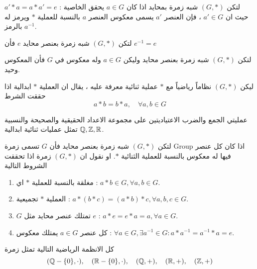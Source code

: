 \begin{definition}[(  المعكوس )]
	لتكن $(G, *)$ شبه زمرة بمحايد اذا كان $a\in G$ يحقق الخاصية : $a'*a=a*a'=e$ حيث ان $a'\in G$ ، فإن العنصر $a'$ يسمى معكوس العنصر $a$ بالنسبة للعملية $*$ ويرمز له بالرمز $a^{-1}$.
\end{definition}

\begin{note}
	لتكن $(G, *)$ شبه زمرة بعنصر محايد $e$ فأن $e^{-1}=e$
\end{note}

\begin{theorem}
	لتكن $(G, *)$ شبه زمرة بعنصر محايد وليكن $a\in G$ وله معكوس في $G$ فأن المعكوس وحيد.
\end{theorem}

\begin{definition}
	ليكن $(G, *)$ نظاماً رياضياً مع $*$ عملية ثنائية معرفة عليه ، يقال ان العملية $*$ ابدالية اذا حققت الشرط
	\[
	a*b = b*a,\quad \forall a,b\in G
	\]
\end{definition}

\begin{example}
	عمليتي الجمع والضرب الاعتياديتين على مجموعة الاعداد الحقيقية والصحيحة والنسبية $\mathbb{Q}, \mathbb{Z}, \mathbb{R}$ تمثل عمليات ثنائية ابدالية. 
\end{example}
\newpage
\begin{definition}[( الزمرة )]
	لتكن $(G, *)$ شبه زمرة بعنصر محايد فأن $G$ تسمى زمرة Group اذا كان كل عنصر فيها له معكوس بالنسبة للعملية الثنائية $*$. او نقول ان $(G, *)$ زمرة اذا تحققت الشروط التالية
	\begin{enumerate}[label=$\boxed{\arabic*}$]
		\item مغلقة بالنسبة للعملية $*$ اي : $a*b \in G , \forall a, b\in G$.
		\item العملية $*$ تجميعية : $a*(b*c) = (a*b)*c , \forall a, b,c\in G$.
		\item $G$ تمتلك عنصر محايد مثل $e$ : $a*e =e*a=a, \forall a\in G$.
		\item كل عنصر $a\in G$ يمتلك معكوس : $\forall a\in G, \exists a^{-1}\in G : a*a^{-1}=a^{-1}*a=e$.
	\end{enumerate}    
\end{definition}

\begin{example}
	كل الانظمة الرياضية التالية تمثل زمرة
	\[
	(\mathbb{Q}-\{0\}, \cdot), \quad(\mathbb{R}-\{0\}, \cdot),\quad (\mathbb{Q}, +) ,\quad (\mathbb{R}, +) ,\quad (\mathbb{Z}, +)
	\]
\end{example}


